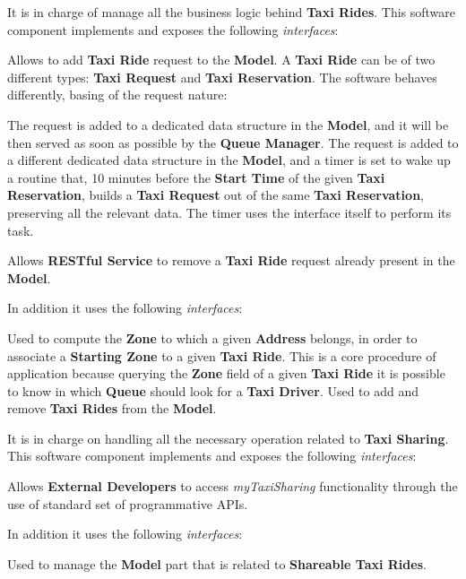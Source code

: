 \begin{itemize}
\begin{itemize}
		 It is in charge of manage all the business logic behind \textbf{Taxi Rides}.
		This software component implements and exposes the following \textit{interfaces}:
		\begin{itemize}
			 Allows to add \textbf{Taxi Ride} request to the \textbf{Model}.
			A \textbf{Taxi Ride} can be of two different types: \textbf{Taxi Request} and \textbf{Taxi Reservation}.
			The software behaves differently, basing of the request nature:
			\begin{itemize}
				 The request is added to a dedicated data structure in the \textbf{Model}, and it will be then served as soon as possible by the \textbf{Queue Manager}.
				 The request is added to a different dedicated data structure in the \textbf{Model}, and a timer is set to wake up a routine that, 10 minutes before the \textbf{Start Time} of the given \textbf{Taxi Reservation}, builds a \textbf{Taxi Request} out of the same \textbf{Taxi Reservation}, preserving all the relevant data.
				The timer uses the interface itself to perform its task.
			\end{itemize}
			 Allows \textbf{RESTful Service} to remove a \textbf{Taxi Ride} request already present in the \textbf{Model}.
		\end{itemize}
		In addition it uses the following \textit{interfaces}:
		\begin{itemize}
			 Used to compute the \textbf{Zone} to which a given \textbf{Address} belongs, in order to associate a \textbf{Starting Zone} to a given \textbf{Taxi Ride}. This is a core procedure of \myTaxiService{} application because querying the \textbf{Zone} field of a given \textbf{Taxi Ride} it is possible to know in which \textbf{Queue} should look for a \textbf{Taxi Driver}.
			 Used to add and remove \textbf{Taxi Rides} from the \textbf{Model}.
		\end{itemize} 
		
		 It is in charge on handling all the necessary operation related to \textbf{Taxi Sharing}.
		This software component implements and exposes the following \textit{interfaces}:
		\begin{itemize}
			 Allows \textbf{External Developers} to access \textit{myTaxiSharing} functionality through the use of standard set of programmative APIs.
		\end{itemize}
		In addition it uses the following \textit{interfaces}:
		\begin{itemize}
			 Used to manage the \textbf{Model} part that is related to \textbf{Shareable Taxi Rides}.
		\end{itemize}
		

\end{itemize}
\end{itemize}

